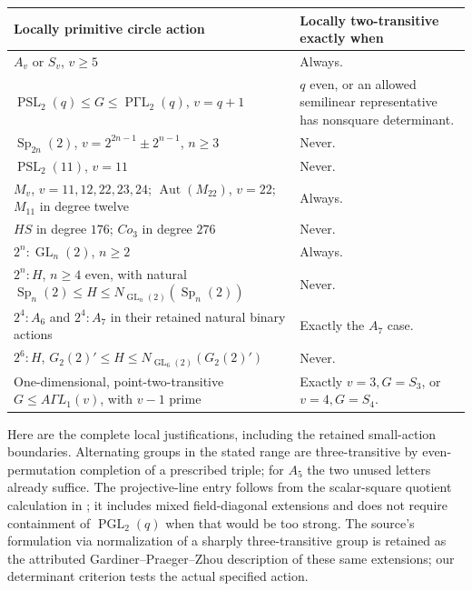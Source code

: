 \documentclass[11pt,a4paper]{article}
\begin{document}
\begin{longtable}{@{}p{}p{}@{}}
\toprule
Locally primitive circle action & Locally two-transitive exactly when\\\midrule\endhead
$A_v$ or $S_v$, $v\geq5$ & Always.\\[2pt]
$\operatorname{PSL}_2(q)\leq G\leq\operatorname{P\Gamma L}_2(q)$,
$v=q+1$ & $q$ even, or an allowed semilinear representative has
nonsquare determinant.\\[2pt]
$\operatorname{Sp}_{2n}(2)$, $v=2^{2n-1}\pm2^{n-1}$, $n\geq3$
& Never.\\[2pt]
$\operatorname{PSL}_2(11)$, $v=11$ & Never.\\[2pt]
$M_v$, $v=11,12,22,23,24$; $\operatorname{Aut}(M_{22})$, $v=22$;
$M_{11}$ in degree twelve & Always.\\[2pt]
$HS$ in degree $176$; $Co_3$ in degree $276$ & Never.\\[2pt]
$2^n:\operatorname{GL}_n(2)$, $n\geq2$ & Always.\\[2pt]
$2^n:H$, $n\geq4$ even, with natural
$\operatorname{Sp}_n(2)\leq H\leq N_{\operatorname{GL}_n(2)}
(\operatorname{Sp}_n(2))$ & Never.\\[2pt]
$2^4:A_6$ and $2^4:A_7$ in their retained natural binary actions
& Exactly the $A_7$ case.\\[2pt]
$2^6:H$, $G_2(2)'\leq H\leq N_{\operatorname{GL}_6(2)}(G_2(2)')$
& Never.\\[2pt]
One-dimensional, point-two-transitive $G\leq A\Gamma L_1(v)$,
with $v-1$ prime & Exactly $v=3,G=S_3$, or $v=4,G=S_4$.\\
\bottomrule
\end{longtable}

Here are the complete local justifications, including the retained
small-action boundaries. Alternating groups in the stated range are
three-transitive by even-permutation completion of a prescribed triple;
for $A_5$ the two unused letters already suffice. The projective-line
entry follows from the scalar-square quotient calculation in
\cite[Proposition~\ref{U-projectiveline}]{U}; it includes mixed
field-diagonal extensions and does not require containment of
$\operatorname{PGL}_2(q)$ when that would be too strong.
The source's formulation via normalization of a sharply three-transitive
group is retained as the attributed Gardiner--Praeger--Zhou description
of these same extensions; our determinant criterion tests the actual
specified action.
\end{document}
